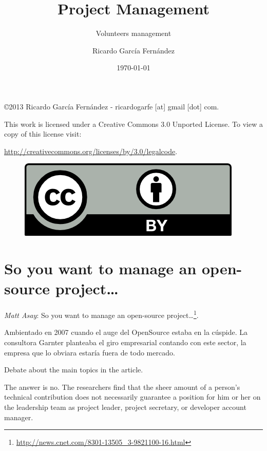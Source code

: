 \documentclass[11pt]{scrartcl}
\title{\textbf{Project Management}}
\subtitle{Volunteers management}
\author{Ricardo Garc\'ia Fern\'andez}
\date{\today}
\begin{document}
\maketitle

\vfill

\begin{flushright}
    \copyright  2013 Ricardo Garc\'ia Fern\'andez - ricardogarfe [at] gmail [dot] com.

    This work is licensed under a Creative Commons 3.0 Unported License.
    To view a copy of this license visit:
 
    \url{http://creativecommons.org/licenses/by/3.0/legalcode}.
\end{flushright}

\begin{figure}[h]
    \begin{flushright}	
        \includegraphics{by}
        \label{fig:by}
    \end{flushright}
\end{figure}

\newpage

\section{So you want to manage an open-source project\ldots}

\emph{Matt Asay}: So you want to manage an open-source project\ldots\footnote{\url{http://news.cnet.com/8301-13505_3-9821100-16.html}}.

\par Ambientado en 2007 cuando el auge del OpenSource estaba en la cúspide. La consultora Garnter planteaba el giro empresarial contando con este sector, la empresa que lo obviara estaría fuera de todo mercado.

\par Debate about the main topics in the article.

The answer is no. The researchers find that the sheer amount of a person's technical contribution does not necessarily guarantee a position for him or her on the leadership team as project leader, project secretary, or developer account manager.
\end{document}
